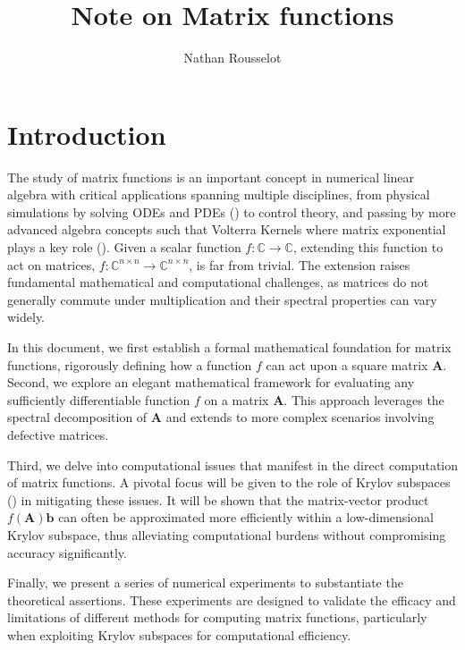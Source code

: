 \documentclass[11pt]{article}
\title{Note on Matrix functions} %
\author{Nathan Rousselot}
\numberwithin{equation}{section}
\begin{document}
\begin{titlingpage}
    \maketitle
\end{titlingpage}
\tableofcontents
\newpage

\section{Introduction}
The study of matrix functions is an important concept in numerical linear algebra with critical applications spanning multiple disciplines, from physical simulations by solving ODEs and PDEs (\cite{higham2008functions}) to control theory, and passing by more advanced algebra concepts such that Volterra Kernels where matrix exponential plays a key role (\cite{burt2017efficient}). Given a scalar function \( f: \mathbb{C} \rightarrow \mathbb{C} \), extending this function to act on matrices, \( f: \mathbb{C}^{n \times n} \rightarrow \mathbb{C}^{n \times n} \), is far from trivial. The extension raises fundamental mathematical and computational challenges, as matrices do not generally commute under multiplication and their spectral properties can vary widely. 

In this document, we first establish a formal mathematical foundation for matrix functions, rigorously defining how a function \( f \) can act upon a square matrix \( \mathbf{A} \). Second, we explore an elegant mathematical framework for evaluating any sufficiently differentiable function \( f \) on a matrix \( \mathbf{A} \). This approach leverages the spectral decomposition of \( \mathbf{A} \) and extends to more complex scenarios involving defective matrices.

Third, we delve into computational issues that manifest in the direct computation of matrix functions. A pivotal focus will be given to the role of Krylov subspaces (\cite{liesen2013krylov}) in mitigating these issues. It will be shown that the matrix-vector product \( f(\mathbf{A})\mathbf{b} \) can often be approximated more efficiently within a low-dimensional Krylov subspace, thus alleviating computational burdens without compromising accuracy significantly.

Finally, we present a series of numerical experiments to substantiate the theoretical assertions. These experiments are designed to validate the efficacy and limitations of different methods for computing matrix functions, particularly when exploiting Krylov subspaces for computational efficiency.
\end{document}
